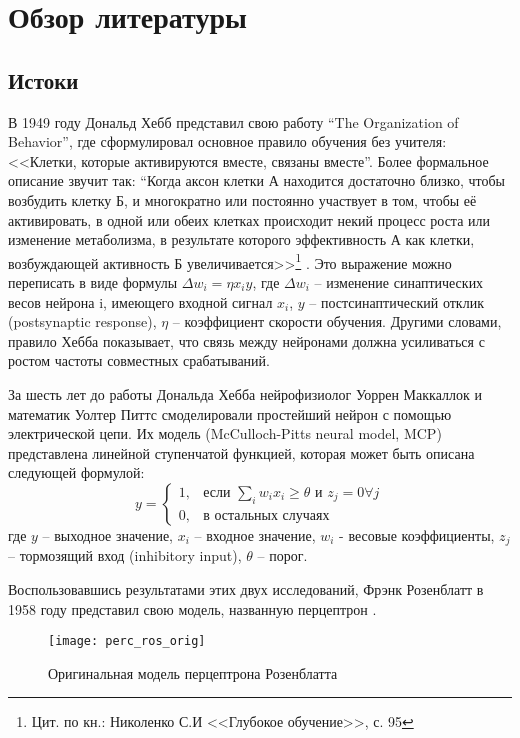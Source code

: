 \clearpage
\section{Обзор литературы}
\subsection{Истоки}
В 1949 году Дональд Хебб представил свою работу “The Organization of Behavior”, где сформулировал основное правило обучения без учителя: <<Клетки, которые активируются вместе, связаны вместе”. Более формальное описание звучит так: “Когда аксон клетки А находится достаточно близко, чтобы возбудить клетку Б, и многократно или постоянно участвует в том, чтобы её активировать, в одной или обеих клетках происходит некий процесс роста или изменение метаболизма, в результате которого эффективность А как клетки, возбуждающей активность Б увеличивается>>\footnote{Цит. по кн.: Николенко С.И <<Глубокое обучение>>, с. 95} . Это выражение можно переписать в виде формулы $\Delta w_i = \eta x_{i} y$, где $\Delta w_i$ – изменение синаптических весов нейрона i, имеющего входной сигнал $x_i$, $y$ – постсинаптический отклик (postsynaptic response),  $\eta$ -- коэффициент скорости обучения. Другими словами, правило Хебба показывает, что связь между нейронами должна усиливаться с ростом частоты совместных срабатываний. 
\par
За шесть лет до работы Дональда Хебба нейрофизиолог Уоррен Маккаллок и математик Уолтер Питтс смоделировали простейший нейрон с помощью электрической цепи. Их модель (McCulloch-Pitts neural model, MCP) представлена линейной ступенчатой функцией, которая может быть описана следующей формулой:
\begin{equation}
	y = 
	\begin{cases}
		1,& \text{если } \sum_{i}{w_i x_i} \geq \theta \text{ и } z_j = 0 \forall{j} \\
		0,& \text{в остальных случаях}
	\end{cases}
\end{equation}
где $y$ – выходное значение, $x_i$ – входное значение, $w_i$ - весовые коэффициенты, $z_j$ – тормозящий вход (inhibitory input), $\theta$ -- порог.
\par
Воспользовавшись результатами этих двух исследований, Фрэнк Розенблатт в 1958 году представил свою модель, названную перцептрон . 
\begin{figure}[h]
	\centering
	\texttt{[image: perc\_ros\_orig]}
	\caption{Оригинальная модель перцептрона Розенблатта}
	\label{hist:rosorig}
\end{figure}
